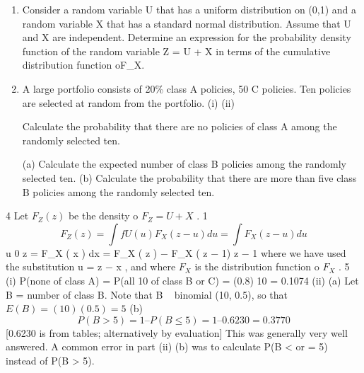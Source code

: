 \documentclass[a4paper,12pt]{article}
\begin{document}
\begin{enumerate}


\item 



Consider a random variable U that has a uniform distribution on (0,1) and a random variable X that has a standard normal distribution. Assume that U and X are independent.
Determine an expression for the probability density function of the random variable Z
= U + X in terms of the cumulative distribution function oF_X.

\item 
A large portfolio consists of 20\% class A policies, 50%
C policies. Ten policies are selected at random from the portfolio.
(i)
(ii)


Calculate the probability that there are no policies of class A among the
randomly selected ten.

(a) Calculate the expected number of class B policies among the randomly
selected ten.
(b) Calculate the probability that there are more than five class B policies
among the randomly selected ten.

\end{enumerate}
\newpage


4
Let $F_Z( z )$ be the density o $F_Z= U + X$ .
1
\[F_Z( z ) = \int f U ( u ) F_X ( z − u ) du = \int F_X ( z − u ) du\]
u
0
z
=
\int F_X ( x ) dx = F_X ( z ) − F_X ( z − 1)
z − 1
where we have used the substitution u = z − x , and where $F_X$ is the distribution
function o $F_X$ .
5
(i) P(none of class A) = P(all 10 of class B or C) = (0.8) 10 = 0.1074
(ii) (a)
Let B = number of class B.
Note that B ~ binomial (10, 0.5), so that $E(B) = (10)(0.5) = 5$
(b)
\[P(B > 5) = 1 – P( B \leq 5 ) = 1 – 0.6230 = 0.3770\]
[0.6230 is from tables; alternatively by evaluation]
This was generally very well answered. A common error in part (ii) (b) was to calculate
P(B < or = 5) instead of P(B > 5).
\end{document}
